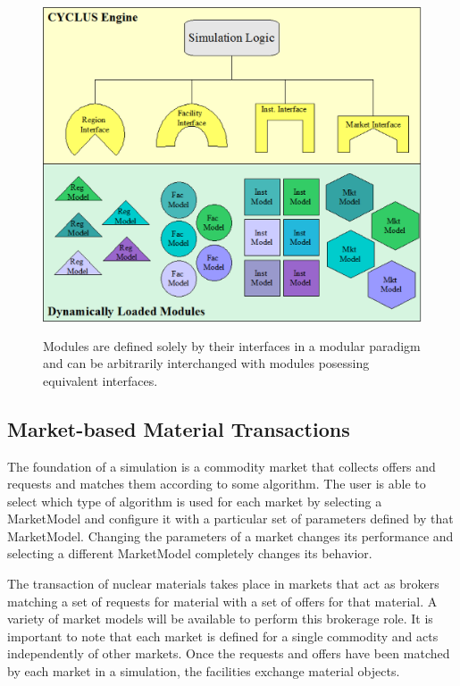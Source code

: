\begin{figure}[htbp!]
  \begin{center}
    \includegraphics[height=10cm]{./chapters/paradigm/modularity.png}
  \end{center}
  \caption[Module Interfaces and Encapsulation]{Modules are defined solely 
  by their interfaces in a modular paradigm and can be arbitrarily 
  interchanged with modules posessing equivalent interfaces.}
  \label{fig:modularity}
\end{figure}

\subsection{Market-based Material Transactions}

The foundation of a simulation is a commodity market that collects 
offers and requests and matches them according to some algorithm.  The 
user is able to select which type of algorithm is used for each market 
by selecting a MarketModel and configure it with a particular set of 
parameters defined by that MarketModel.  Changing the parameters of a 
market changes its performance and selecting a different MarketModel 
completely changes its behavior.

The transaction of nuclear materials takes place in markets that act
as brokers matching a set of requests for material with a set of
offers for that material. A variety of market models will be available
to perform this brokerage role. It is important to note that each
market is defined for a single commodity and acts independently of
other markets. Once the requests and offers have been matched by each
market in a simulation, the facilities exchange material objects.

